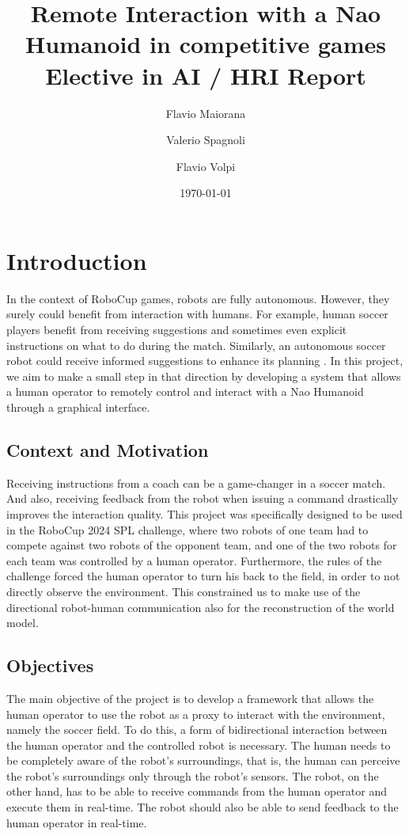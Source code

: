 \documentclass[a4paper, onecolumn, 12pt]{article}
\title{Remote Interaction with a Nao Humanoid in competitive games \\ Elective in AI / HRI Report}
\author{Flavio Maiorana \and Valerio Spagnoli \and Flavio Volpi}
\date{\today}
\begin{document}
\maketitle

\section{Introduction}
\label{sec:intro}

In the context of RoboCup games, robots are fully autonomous. However, they
surely could benefit from interaction with humans. For example, human soccer
players benefit from receiving suggestions and sometimes even explicit
instructions on what to do during the match. Similarly, an autonomous soccer
robot could receive informed suggestions to enhance its planning
. In this project, we aim to make a
small step in that direction by developing a system that allows a human operator
to remotely control and interact with a Nao Humanoid through a graphical
interface. 

\subsection{Context and Motivation}
\label{sec:context}

Receiving instructions from a coach can be a game-changer in a soccer match. And
also, receiving feedback from the robot when issuing a command drastically
improves the interaction quality. This project was specifically designed to be
used in the RoboCup 2024 SPL challenge, where two robots of one team had to
compete against two robots of the opponent team, and one of the two robots for
each team was controlled by a human operator. Furthermore, the rules of the
challenge forced the human operator to turn his back to the field, in order to
not directly observe the environment. This constrained us to make use of the
directional robot-human communication also for the reconstruction of the world
model.



\subsection{Objectives}
\label{sec:obj}

The main objective of the project is to develop a framework that allows the human operator
to use the robot as a proxy to interact with the environment, namely the soccer
field. To do this, a form of bidirectional interaction between the human operator 
and the controlled robot is necessary. The human needs
to be completely aware of the robot's surroundings, that is, the human can
perceive the robot's surroundings only through the robot's sensors. The robot,
on the other hand, has to be able to receive commands from the human operator
and execute them in real-time. The robot should also be able to send feedback to
the human operator in real-time. 
\end{document}
